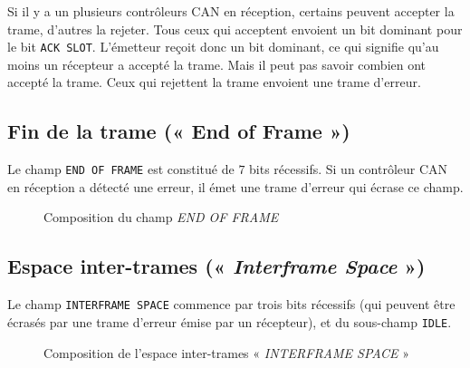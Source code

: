 Si il y a un plusieurs contrôleurs CAN en réception, certains peuvent accepter la trame, d'autres la rejeter. Tous ceux qui acceptent envoient un bit dominant pour le bit \texttt{ACK SLOT}. L'émetteur reçoit donc un bit dominant, ce qui signifie qu'au moins un récepteur a accepté la trame. Mais il peut pas savoir combien ont accepté la trame. Ceux qui rejettent la trame envoient une trame d'erreur.




\subsection{Fin de la trame (« End of Frame »)}

Le champ \texttt{END OF FRAME} est constitué de $7$ bits récessifs. Si un contrôleur CAN en réception a détecté une erreur, il émet une trame d'erreur qui écrase ce champ.


\begin{figure}[h]
  \centering
  \caption{Composition du champ \emph{END OF FRAME}}
\end{figure}


\subsection{Espace inter-trames (« \emph{Interframe Space} »)}

Le champ \texttt{INTERFRAME SPACE} commence par trois bits récessifs (qui peuvent être écrasés par une trame d'erreur émise par un récepteur), et du sous-champ \texttt{IDLE}.

\begin{figure}[h]
  \centering
  \caption{Composition de l'espace inter-trames « \emph{INTERFRAME SPACE} »}
\end{figure}

